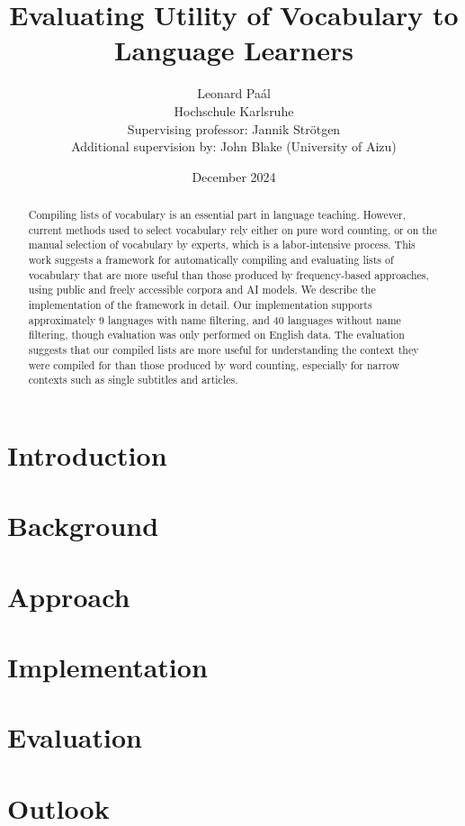 \documentclass[12pt]{report}
\title{Evaluating Utility of Vocabulary to Language Learners}
\author{Leonard Paál\\Hochschule Karlsruhe\\Supervising professor: Jannik Strötgen\\Additional supervision by: John Blake (University of Aizu)}
\date{December 2024}
\begin{document}
\maketitle
\begin{abstract}
	Compiling lists of vocabulary is an essential part in language teaching.
	However, current methods used to select vocabulary rely either on pure word counting, or on the manual selection of vocabulary by experts, which is a labor-intensive process.
	This work suggests a framework for automatically compiling and evaluating lists of vocabulary that are more useful than those produced by frequency-based approaches, using public and freely accessible corpora and AI models.
	We describe the implementation of the framework in detail.
	Our implementation supports approximately 9 languages with name filtering, and 40 languages without name filtering, though evaluation was only performed on English data.
	The evaluation suggests that our compiled lists are more useful for understanding the context they were compiled for than those produced by word counting, especially for narrow contexts such as single subtitles and articles.
\end{abstract}

\clearpage
\tableofcontents
\clearpage

\chapter{Introduction} \label{ch:intro}

\chapter{Background} \label{ch:background}

\chapter{Approach} \label{ch:approach}

\chapter{Implementation} \label{ch:implementation}

\chapter{Evaluation} \label{ch:evaluation}

\chapter{Outlook} \label{ch:outlook}


% 



\end{document}
